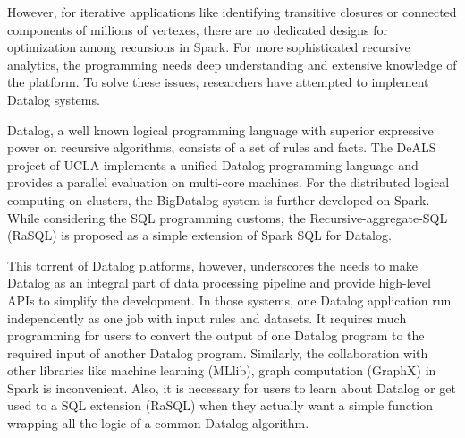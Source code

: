 However, for iterative applications like identifying transitive closures or connected components of millions of vertexes, there are no dedicated designs for optimization among recursions in Spark.
For  more sophisticated recursive analytics, the programming needs deep understanding and extensive knowledge of the platform.  To solve these issues, researchers have attempted to implement Datalog  \citep{consens1990low} systems. 

Datalog, a well known logical programming language with superior expressive power on recursive algorithms, consists of a set of rules and facts. The DeALS project of UCLA \citep{yang2015parallel} implements a unified Datalog programming language and provides a parallel evaluation on multi-core machines. For the distributed logical computing on clusters, the BigDatalog \citep{shkapsky2016big} system is further developed on Spark. While considering the SQL programming customs, the Recursive-aggregate-SQL (RaSQL) \citep{gu2019rasql} is proposed as a simple extension of Spark SQL for Datalog.  


This torrent of Datalog platforms, however, underscores the needs to make Datalog as an integral part of data processing pipeline and provide high-level APIs to simplify the development. %
In those systems, one Datalog application run independently as one  job with input rules and datasets. It requires much programming for users to convert the output of one Datalog program to the required input of another Datalog program. Similarly, the collaboration with other libraries like machine learning (MLlib), graph computation (GraphX) in Spark is inconvenient. Also, it is necessary for users to learn about Datalog or get used to a SQL extension (RaSQL) when they actually  want a simple function wrapping all the logic of a common Datalog algorithm. 


